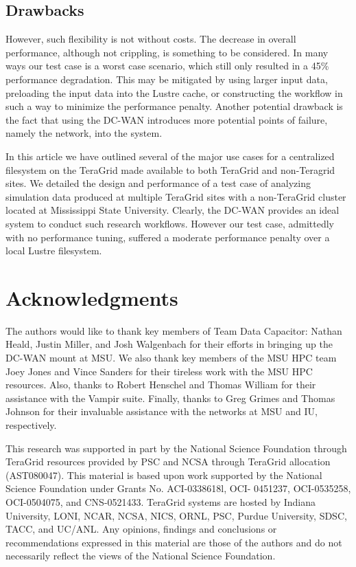 \documentclass[]{sig-alternate}
\begin{document}
\subsection{Drawbacks}
However, such flexibility is not without costs. The decrease in overall performance, although not crippling, is something to be considered. In many ways our test case is a worst case scenario, which still only resulted in a 45\% performance degradation. This may be mitigated by using larger input data, preloading the input data into the Lustre cache, or constructing the workflow in such a way to minimize the performance penalty. Another potential drawback is the fact that using the DC-WAN introduces more potential points of failure, namely the network, into the system. 

In this article we have outlined several of the major use cases for a centralized filesystem on the TeraGrid made available to both TeraGrid and non-Teragrid sites. We detailed the design and performance of a test case of analyzing simulation data produced at multiple TeraGrid sites with a non-TeraGrid cluster located at Mississippi State University. Clearly, the DC-WAN provides an ideal system to conduct such research workflows. However our test case, admittedly with no performance tuning, suffered a moderate performance penalty over a local Lustre filesystem.  

\section{Acknowledgments}
The authors would like to thank key members of Team Data Capacitor: Nathan Heald, Justin Miller, and Josh Walgenbach for their efforts in bringing up the DC-WAN mount at MSU. We also thank key members of the MSU HPC team Joey Jones and Vince Sanders for their tireless work with the MSU HPC resources. Also, thanks to Robert Henschel and Thomas William for their assistance with the Vampir suite. Finally, thanks to Greg Grimes and Thomas Johnson for their invaluable assistance with the networks at MSU and IU, respectively.

This research was supported in part by the National Science Foundation through TeraGrid resources provided by PSC and NCSA through TeraGrid allocation (AST080047). This material is based upon work supported by the National Science Foundation under Grants No. ACI-0338618l, OCI- 0451237, OCI-0535258, OCI-0504075, and CNS-0521433. TeraGrid systems are hosted by Indiana University, LONI, NCAR, NCSA, NICS, ORNL, PSC, Purdue University, SDSC, TACC, and UC/ANL. Any opinions, findings and conclusions or recommendations expressed in this material are those of the authors and do not necessarily reflect the views of the National Science Foundation.


\end{document}

